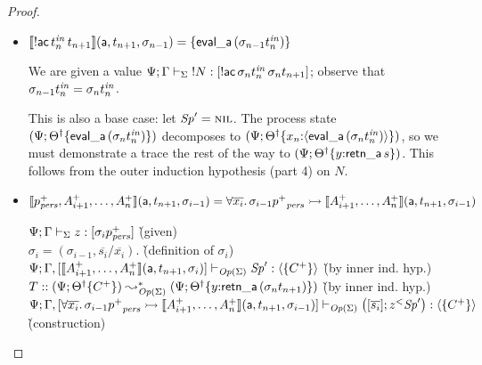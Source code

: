 \begin{proof}
\begin{itemize}
\item $\llbracket {{!}{\sf ac}\,t^{\it in}_n\,t_{n+1}} \rrbracket({\sf a},{t_{n+1}},{\sigma_{n-1}}) 
  = \{{\sf eval\_a}\,(\sigma_{n-1}{t^{\it in}_n})\}$

  \bigskip
  We are given a value 
  ${\Psi}; {\Gamma} \vdash_{\Sigma} {{!}{N}} : {[{{!}}{\sf ac}\,\sigma_n{t^{\it in}_n}\,\sigma_n{t_{n+1}}]}$;
  observe that $\sigma_{n-1}{t_n^{\it in}} = \sigma_n{t_n^{\it in}}$.

  \smallskip
  This is also a base case: let ${\it Sp}' = \textsc{nil}$. The process state
  $(\Psi; 
  {{{\Theta}^\dag}}\{{{\sf eval\_a}\,(\sigma_{n}{t^{\it in}_n})}\})$
  decomposes to 
  $(\Psi; 
  {{{\Theta}^\dag}}\{{x_{n}{:}{\langle {{\sf eval\_a}\,(\sigma_{n}{t^{\it in}_n})} \rangle}}\})$, so we must
  demonstrate a trace the rest of the way to
  $(\Psi; {{{\Theta}^\dag}}\{{y{:}{\sf retn\_a}\,s}\})$. 
  This follows from the
  outer induction hypothesis (part 4) on $N$. 
  \bigskip

\item $\llbracket {p^+_{\it pers},A^+_{i+1},\ldots,A^+_n} \rrbracket({\sf a},{t_{n+1}},{\sigma_{i-1}}) 
  = \forall \overline{x_i}.\, \sigma_{i-1}{p^+}_{\it pers} \rightarrowtail \llbracket {A^+_{i+1},\ldots,A^+_n} \rrbracket({\sf a},{t_{n+1}},{\sigma_{i-1}})$

  \begin{tabbing}
  ${\Psi}; {\Gamma} \vdash_{\Sigma} {z} : {[\sigma_i{p^+_{\it pers}}]}$
  \` (given) 
  \\
  $\sigma_i = (\sigma_{i-1}, \overline{s_i}/\overline{x_i})$.
  \` (definition of $\sigma_i$)
  \\
  ${\Psi}; {\Gamma, [\llbracket {A^+_{i+1},\ldots,A^+_n} \rrbracket({\sf a},{t_{n+1}},{\sigma_{i}})]} \vdash_{{\it Op}({\Sigma})} {{\it Sp}'} : {\langle {\{ C^+ \} } \rangle}$
  \` (by inner ind. hyp.)
  \\
  $T :: (\Psi; {{{\Theta}^\dag}}\{{C^+}\}) \leadsto^*_{{\it Op}({\Sigma})}
   (\Psi; {{{\Theta}^\dag}}\{{y{:}{\sf retn\_a}\,({\sigma_n}t_{n+1})}\})$
  \` (by inner ind. hyp.)
  \\
  ${\Psi}; {\Gamma, [\forall \overline{x_i}.\, \sigma_{i-1}{p^+}_{\it pers} 
                \rightarrowtail \llbracket {A^+_{i+1},\ldots,A^+_n} \rrbracket({\sf a},{t_{n+1}},{\sigma_{i-1}})]} \vdash_{{\it Op}({\Sigma})} {\left([{\overline{s_i}}]; {{z}{^{<}}{{\it Sp}'}}\right)} : {\langle {\{ C^+ \}} \rangle}$
  \\ 
  \` (construction)
  \end{tabbing}


\end{itemize}
\end{proof}
